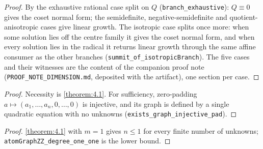 \begin{proof}
By the exhaustive rational case split on $Q$ (\texttt{branch\_exhaustive}): $Q ≡ 0$ gives the coset normal form; the semidefinite, negative-semidefinite and quotient-anisotropic cases give linear growth. The isotropic case splits once more: when some solution lies off the centre family it gives the coset normal form, and when every solution lies in the radical it returns linear growth through the same affine consumer as the other branches (\texttt{summit\_of\_isotropicBranch}). The five cases and their witnesses are the content of the companion proof note (\texttt{PROOF\_NOTE\_DIMENSION.md}, deposited with the artifact), one section per case.

\end{proof}
\begin{proof}
Necessity is \cref{theorem:4.1}. For sufficiency, zero-padding $a ↦ (a_{1}, …, a_{n}, 0, …, 0)$ is injective, and its graph is defined by a single quadratic equation with no unknowns (\texttt{exists\_graph\_injective\_pad}).

\end{proof}
\begin{proof}
\cref{theorem:4.1} with $m = 1$ gives $n ≤ 1$ for every finite number of unknowns; \texttt{atomGraphZZ\_degree\_one\_one} is the lower bound.

\end{proof}
